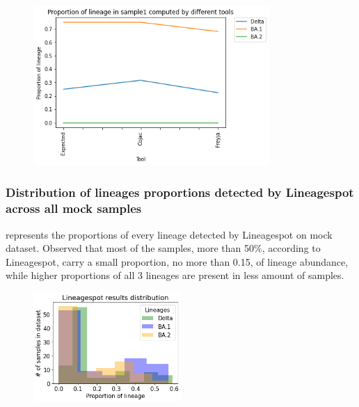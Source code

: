         \begin{figure}[H]
        	\centering
            \includegraphics[width=0.8\textwidth]{figures/further/line-s1.png}
            \label{fig:further:line-s1}
        \end{figure}
        
       \subsubsection{Distribution of lineages proportions detected by Lineagespot across all mock samples}  
         represents the proportions of every lineage detected by Lineagespot on mock dataset. Observed that most of the samples, more than 50\%, according to Lineagespot, carry a small proportion, no more than 0.15, of lineage abundance, while higher proportions of all 3 lineages are present in less amount of samples.
        \begin{figure}[H]
        	\centering
            \includegraphics[width=0.5\textwidth]{figures/further/distr-lineagespot.png}
            \label{fig:further:dist-ls}
        \end{figure}
        
